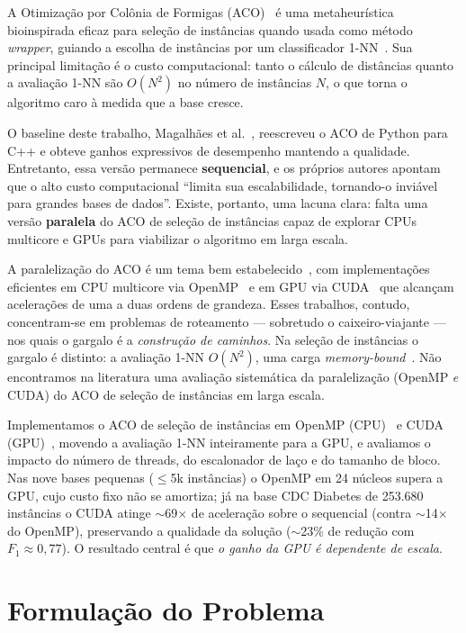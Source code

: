 \documentclass[12pt]{article}
\begin{document}
A Otimização por Colônia de Formigas (ACO)~\cite{dorigo2006} é uma metaheurística
bioinspirada eficaz para seleção de instâncias quando usada como método \textit{wrapper},
guiando a escolha de instâncias por um classificador 1-NN~\cite{cover1967}. Sua principal
limitação é o custo computacional: tanto o cálculo de distâncias quanto a avaliação 1-NN são
$O(N^2)$ no número de instâncias $N$, o que torna o algoritmo caro à medida que a base cresce.

O baseline deste trabalho, Magalhães et al.~\cite{magalhaes2024}, reescreveu o ACO de Python
para C++ e obteve ganhos expressivos de desempenho mantendo a qualidade. Entretanto, essa
versão permanece \textbf{sequencial}, e os próprios autores apontam que o alto custo
computacional ``limita sua escalabilidade, tornando-o inviável para grandes bases de dados''.
Existe, portanto, uma lacuna clara: falta uma versão \textbf{paralela} do ACO de seleção de
instâncias capaz de explorar CPUs multicore e GPUs para viabilizar o algoritmo em larga escala.

A paralelização do ACO é um tema bem estabelecido~\cite{pedemonte2011}, com implementações
eficientes em CPU multicore via OpenMP~\cite{abouelfarag2015} e em GPU via
CUDA~\cite{delevacq2013} que alcançam acelerações de uma a duas ordens de grandeza. Esses
trabalhos, contudo, concentram-se em problemas de roteamento --- sobretudo o caixeiro-viajante
--- nos quais o gargalo é a \textit{construção de caminhos}. Na seleção de instâncias o gargalo
é distinto: a avaliação 1-NN $O(N^2)$, uma carga \textit{memory-bound}~\cite{williams2009}. Não
encontramos na literatura uma avaliação sistemática da paralelização (OpenMP \textit{e} CUDA) do
ACO de seleção de instâncias em larga escala.

Implementamos o ACO de seleção de instâncias em OpenMP
(CPU)~\cite{dagum1998} e CUDA (GPU)~\cite{nickolls2008}, movendo a avaliação 1-NN inteiramente
para a GPU, e avaliamos o impacto do número de threads, do escalonador de laço e do tamanho de
bloco. Nas nove bases pequenas ($\leq$5k instâncias) o OpenMP em 24 núcleos supera a GPU, cujo
custo fixo não se amortiza; já na base CDC Diabetes de 253.680 instâncias o CUDA atinge
$\sim$69$\times$ de aceleração sobre o sequencial (contra $\sim$14$\times$ do OpenMP),
preservando a qualidade da solução ($\sim$23\% de redução com $F_1\approx0{,}77$). O resultado
central é que \textit{o ganho da GPU é dependente de escala}.


\section{Formulação do Problema}
\end{document}
